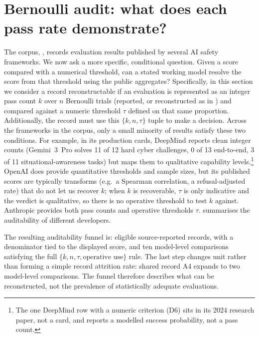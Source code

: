 \documentclass{article}
\begin{document}
\section{Bernoulli audit: what does each pass rate demonstrate?}
\label{sec:audit}

The corpus, , records evaluation results published by several AI safety frameworks. We now ask a more specific, conditional question. Given a score compared with a numerical threshold, can a stated working model resolve the score from that threshold using the public aggregates? Specifically, in this section we consider a record reconstructable if an evaluation is represented as an integer pass count $k$ over $n$ Bernoulli trials
(reported, or reconstructed as in ) and compared against a
numeric threshold $\tau$ defined on that same proportion. Additionally, the record must use this $\{k, n, \tau\}$ tuple to make a decision. Across the frameworks in the corpus, only a small minority of results satisfy these two conditions. For example, in its production cards, DeepMind reports clean integer counts (Gemini~3~Pro solves 11 of 12 hard cyber
challenges, 0 of 13 end-to-end, 3 of 11 situational-awareness tasks) but maps them to qualitative capability levels.\footnote{The one DeepMind row with a numeric criterion (D6) sits in its 2024 research paper, not a card, and reports a modelled success probability, not a pass count.} OpenAI does provide quantitative thresholds and sample sizes, but its published scores are typically transforms (e.g.\ a Spearman correlation, a refusal-adjusted rate) that do not let us recover $k$; when $k$ is recoverable, $\tau$ is only indicative and the verdict is qualitative, so there is no operative threshold to test $k$ against. Anthropic provides both pass counts and operative thresholds $\tau$.  summarises the auditability of different developers.

The resulting auditability funnel is: \CensusTotal{} eligible source-reported records,
\CensusScoreN{} with a denominator tied to the displayed score, and ten model-level
comparisons satisfying the full $\{k,n,\tau,\text{operative use}\}$ rule. The last step
changes unit rather than forming a simple record attrition rate: shared record A4 expands to
two model-level comparisons. The funnel therefore describes what can be reconstructed, not
the prevalence of statistically adequate evaluations.
\end{document}
